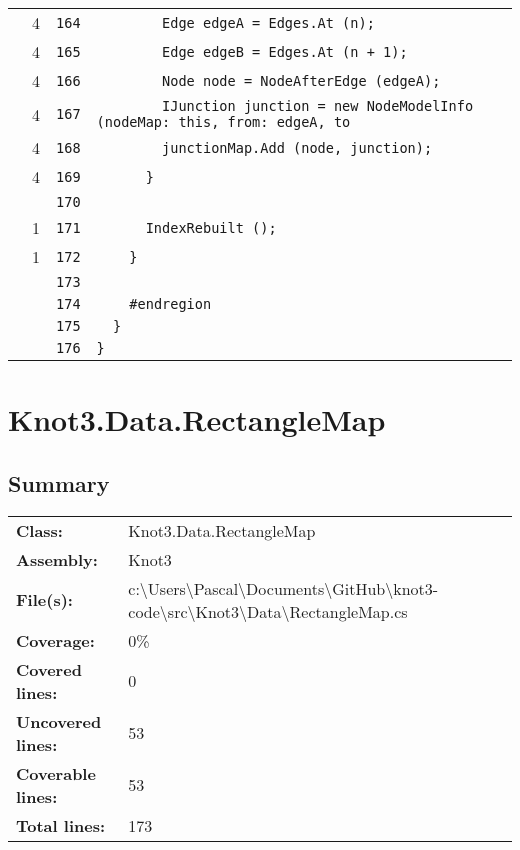 \documentclass[a4paper,10pt]{article}
\begin{document}
\begin{longtable}[l]{lrrl}
\cellcolor{green} & 4 & \verb~164~ & \verb~        Edge edgeA = Edges.At (n);~\\
\cellcolor{green} & 4 & \verb~165~ & \verb~        Edge edgeB = Edges.At (n + 1);~\\
\cellcolor{green} & 4 & \verb~166~ & \verb~        Node node = NodeAfterEdge (edgeA);~\\
\cellcolor{green} & 4 & \verb~167~ & \verb~        IJunction junction = new NodeModelInfo (nodeMap: this, from: edgeA, to~\\
\cellcolor{green} & 4 & \verb~168~ & \verb~        junctionMap.Add (node, junction);~\\
\cellcolor{green} & 4 & \verb~169~ & \verb~      }~\\
\cellcolor{gray} &  & \verb~170~ & \verb~~\\
\cellcolor{green} & 1 & \verb~171~ & \verb~      IndexRebuilt ();~\\
\cellcolor{green} & 1 & \verb~172~ & \verb~    }~\\
\cellcolor{gray} &  & \verb~173~ & \verb~~\\
\cellcolor{gray} &  & \verb~174~ & \verb~    #endregion~\\
\cellcolor{gray} &  & \verb~175~ & \verb~  }~\\
\cellcolor{gray} &  & \verb~176~ & \verb~}~\\
\end{longtable}
\newpage
\section{Knot3.Data.RectangleMap}
\subsection{Summary}
\begin{longtable}[l]{ll}
\textbf{Class:} & Knot3.Data.RectangleMap\\
\textbf{Assembly:} & Knot3\\
\textbf{File(s):} & \begin{minipage}[t]{12cm}{c:\textbackslash Users\textbackslash Pascal\textbackslash Documents\textbackslash GitHub\textbackslash knot3-code\textbackslash src\textbackslash Knot3\textbackslash Data\textbackslash RectangleMap.cs}\end{minipage} \\
\textbf{Coverage:} & 0\%\\
\textbf{Covered lines:} & 0\\
\textbf{Uncovered lines:} & 53\\
\textbf{Coverable lines:} & 53\\
\textbf{Total lines:} & 173\\
\end{longtable}
\end{document}
